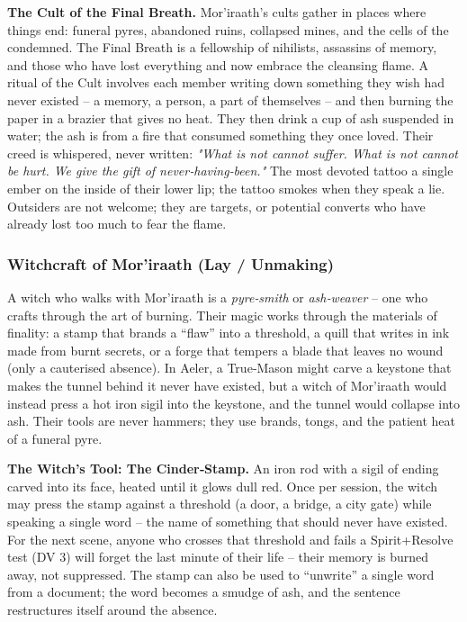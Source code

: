 \textbf{The Cult of the Final Breath.} Mor'iraath’s cults gather in places where things end: funeral pyres, abandoned ruins, collapsed mines, and the cells of the condemned. The Final Breath is a fellowship of nihilists, assassins of memory, and those who have lost everything and now embrace the cleansing flame. A ritual of the Cult involves each member writing down something they wish had never existed – a memory, a person, a part of themselves – and then burning the paper in a brazier that gives no heat. They then drink a cup of ash suspended in water; the ash is from a fire that consumed something they once loved. Their creed is whispered, never written: \textit{"What is not cannot suffer. What is not cannot be hurt. We give the gift of never‑having‑been."} The most devoted tattoo a single ember on the inside of their lower lip; the tattoo smokes when they speak a lie. Outsiders are not welcome; they are targets, or potential converts who have already lost too much to fear the flame.

\subsubsection*{Witchcraft of Mor'iraath (Lay / Unmaking)}

A witch who walks with Mor'iraath is a \textit{pyre‑smith} or \textit{ash‑weaver} – one who crafts through the art of burning. Their magic works through the materials of finality: a stamp that brands a “flaw” into a threshold, a quill that writes in ink made from burnt secrets, or a forge that tempers a blade that leaves no wound (only a cauterised absence). In Aeler, a True‑Mason might carve a keystone that makes the tunnel behind it never have existed, but a witch of Mor'iraath would instead press a hot iron sigil into the keystone, and the tunnel would collapse into ash. Their tools are never hammers; they use brands, tongs, and the patient heat of a funeral pyre.

\textbf{The Witch’s Tool: The Cinder‑Stamp.} An iron rod with a sigil of ending carved into its face, heated until it glows dull red. Once per session, the witch may press the stamp against a threshold (a door, a bridge, a city gate) while speaking a single word – the name of something that should never have existed. For the next scene, anyone who crosses that threshold and fails a Spirit+Resolve test (DV 3) will forget the last minute of their life – their memory is burned away, not suppressed. The stamp can also be used to “unwrite” a single word from a document; the word becomes a smudge of ash, and the sentence restructures itself around the absence.

